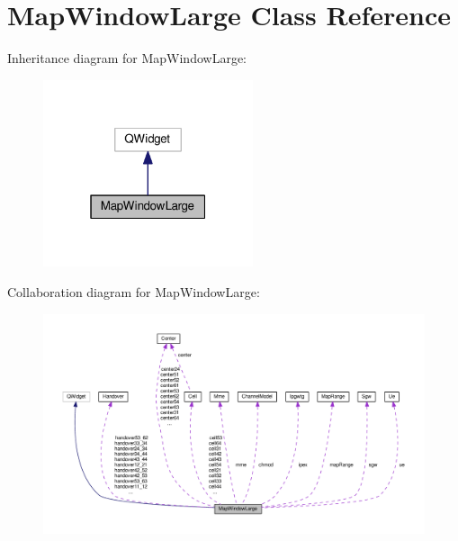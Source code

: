 \hypertarget{class_map_window_large}{}\section{Map\+Window\+Large Class Reference}
\label{class_map_window_large}


Inheritance diagram for Map\+Window\+Large\+:
\nopagebreak
\begin{figure}[H]
\begin{center}
\leavevmode
\includegraphics[width=175pt]{class_map_window_large__inherit__graph}
\end{center}
\end{figure}


Collaboration diagram for Map\+Window\+Large\+:
\nopagebreak
\begin{figure}[H]
\begin{center}
\leavevmode
\includegraphics[width=350pt]{class_map_window_large__coll__graph}
\end{center}
\end{figure}
